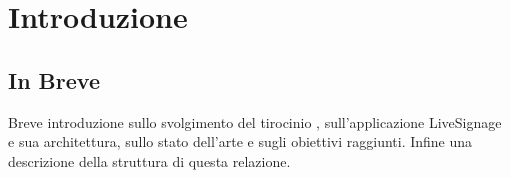 \chapter{Introduzione}
\linespread{1.5}

\section{In Breve}
Breve introduzione sullo  svolgimento del tirocinio , sull'applicazione LiveSignage e sua architettura, sullo stato dell'arte e sugli obiettivi raggiunti. Infine una descrizione della struttura di questa relazione.

